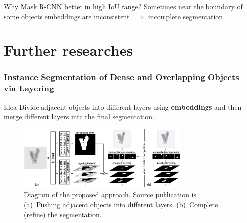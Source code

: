 \documentclass{beamer}
\begin{document}
\begin{frame}
    \begin{block}{Why Mask R-CNN better in high IoU range?}
        Sometimes near the boundary of some objects embeddings are
        inconsistent $\implies$ incomplete segmentation.
    \end{block}

\end{frame}

\section{Further researches}

\begin{frame}
    \frametitle{Instance Segmentation of Dense and Overlapping Objects via Layering}

    \begin{block}{Idea}
        Divide adjacent objects into different layers using \textbf{embeddings}
        and then merge different layers into
        the final segmentation.
    \end{block}

    \begin{figure}[h]
        \includegraphics[width=0.75\textwidth]{inst_segm_layering.png}
        \caption{Diagram of the proposed approach. Source  publication is \cite{chen2022instance}
            (a)~Pushing adjacent objects into different layers. (b)~Complete (refine)
            the segmentation.}
    \end{figure}

\end{frame}
\end{document}
